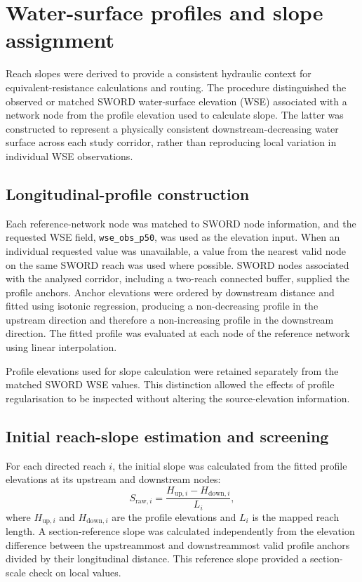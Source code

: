 \section{Water-surface profiles and slope assignment}
\label{app:slope_estimation}

Reach slopes were derived to provide a consistent hydraulic context for equivalent-resistance calculations and routing. The procedure distinguished the observed or matched SWORD water-surface elevation (WSE) associated with a network node from the profile elevation used to calculate slope. The latter was constructed to represent a physically consistent downstream-decreasing water surface across each study corridor, rather than reproducing local variation in individual WSE observations.

\subsection{Longitudinal-profile construction}

Each reference-network node was matched to SWORD node information, and the requested WSE field, \texttt{wse\_obs\_p50}, was used as the elevation input. When an individual requested value was unavailable, a value from the nearest valid node on the same SWORD reach was used where possible. SWORD nodes associated with the analysed corridor, including a two-reach connected buffer, supplied the profile anchors. Anchor elevations were ordered by downstream distance and fitted using isotonic regression, producing a non-decreasing profile in the upstream direction and therefore a non-increasing profile in the downstream direction. The fitted profile was evaluated at each node of the reference network using linear interpolation.

Profile elevations used for slope calculation were retained separately from the matched SWORD WSE values. This distinction allowed the effects of profile regularisation to be inspected without altering the source-elevation information.

\subsection{Initial reach-slope estimation and screening}

For each directed reach $i$, the initial slope was calculated from the fitted profile elevations at its upstream and downstream nodes:
\begin{equation}
S_{\mathrm{raw},i}=\frac{H_{\mathrm{up},i}-H_{\mathrm{down},i}}{L_i},
\end{equation}
where $H_{\mathrm{up},i}$ and $H_{\mathrm{down},i}$ are the profile elevations and $L_i$ is the mapped reach length. A section-reference slope was calculated independently from the elevation difference between the upstreammost and downstreammost valid profile anchors divided by their longitudinal distance. This reference slope provided a section-scale check on local values.

